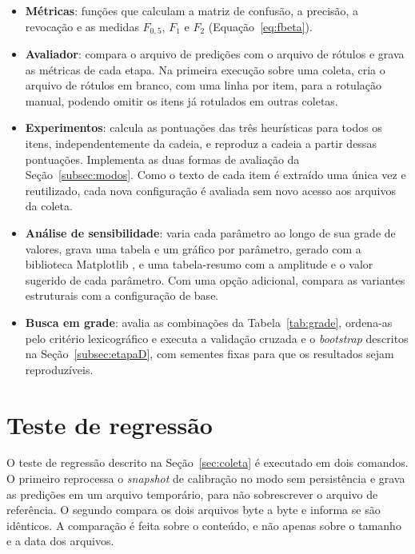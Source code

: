 \begin{itemize}
  \item \textbf{Métricas}: funções que calculam a matriz de confusão, a
    precisão, a revocação e as medidas $F_{0{,}5}$, $F_1$ e $F_2$
    (Equação~\ref{eq:fbeta}).
  \item \textbf{Avaliador}: compara o arquivo de predições com o arquivo de
    rótulos e grava as métricas de cada etapa. Na primeira execução sobre uma
    coleta, cria o arquivo de rótulos em branco, com uma linha por item, para
    a rotulação manual, podendo omitir os itens já rotulados em outras
    coletas.
  \item \textbf{Experimentos}: calcula as pontuações das três heurísticas para
    todos os itens, independentemente da cadeia, e reproduz a cadeia a partir
    dessas pontuações. Implementa as duas formas de avaliação da
    Seção~\ref{subsec:modos}. Como o texto de cada item é extraído uma única
    vez e reutilizado, cada nova configuração é avaliada sem novo acesso aos
    arquivos da coleta.
  \item \textbf{Análise de sensibilidade}: varia cada parâmetro ao longo de
    sua grade de valores, grava uma tabela e um gráfico por parâmetro, gerado
    com a biblioteca Matplotlib \cite{hunter2007}, e uma tabela-resumo com a
    amplitude e o valor sugerido de cada parâmetro. Com uma opção adicional,
    compara as variantes estruturais com a configuração de base.
  \item \textbf{Busca em grade}: avalia as combinações da
    Tabela~\ref{tab:grade}, ordena-as pelo critério lexicográfico e executa a
    validação cruzada e o \textit{bootstrap} descritos na
    Seção~\ref{subsec:etapaD}, com sementes fixas para que os resultados sejam
    reproduzíveis.
\end{itemize}

\section{Teste de regressão}
\label{sec:impl_regressao}

O teste de regressão descrito na Seção~\ref{sec:coleta} é executado em dois
comandos. O primeiro reprocessa o \textit{snapshot} de calibração no modo sem
persistência e grava as predições em um arquivo temporário, para não
sobrescrever o arquivo de referência. O segundo compara os dois arquivos
byte a byte e informa se são idênticos. A comparação é feita sobre o
conteúdo, e não apenas sobre o tamanho e a data dos arquivos.

